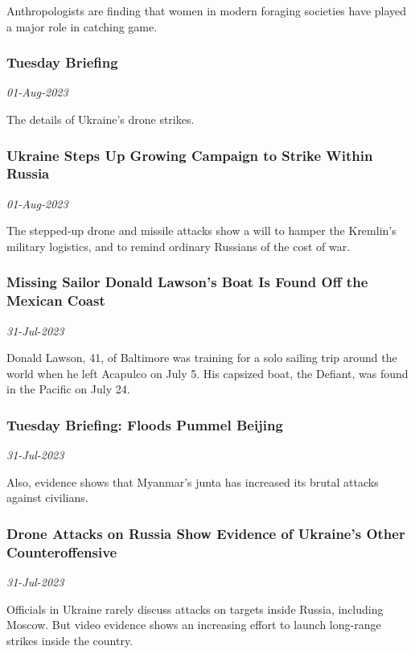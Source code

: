 Anthropologists are finding that women in modern foraging societies have played a major role in catching game.
\subsubsection{Tuesday Briefing \href{https://www.nytimes.com/2023/07/31/briefing/ukraine-strikes-trump-myanmar.html}{}}
\textit{01-Aug-2023}

The details of Ukraine’s drone strikes.
\subsubsection{Ukraine Steps Up Growing Campaign to Strike Within Russia \href{https://www.nytimes.com/2023/07/31/world/europe/ukraine-russia-drone-strikes.html}{}}
\textit{01-Aug-2023}

The stepped-up drone and missile attacks show a will to hamper the Kremlin’s military logistics, and to remind ordinary Russians of the cost of war.
\subsubsection{Missing Sailor Donald Lawson’s Boat Is Found Off the Mexican Coast \href{https://www.nytimes.com/2023/07/31/world/americas/donald-lawson-missing-sailor-boat.html}{}}
\textit{31-Jul-2023}

Donald Lawson, 41, of Baltimore was training for a solo sailing trip around the world when he left Acapulco on July 5. His capsized boat, the Defiant, was found in the Pacific on July 24.
\subsubsection{Tuesday Briefing: Floods Pummel Beijing \href{https://www.nytimes.com/2023/07/31/world/floods-beijing-china-asia.html}{}}
\textit{31-Jul-2023}

Also, evidence shows that Myanmar’s junta has increased its brutal attacks against civilians.
\subsubsection{Drone Attacks on Russia Show Evidence of Ukraine’s Other Counteroffensive \href{https://www.nytimes.com/2023/07/31/world/europe/ukraine-drone-strikes-russia.html}{}}
\textit{31-Jul-2023}

Officials in Ukraine rarely discuss attacks on targets inside Russia, including Moscow. But video evidence shows an increasing effort to launch long-range strikes inside the country.
